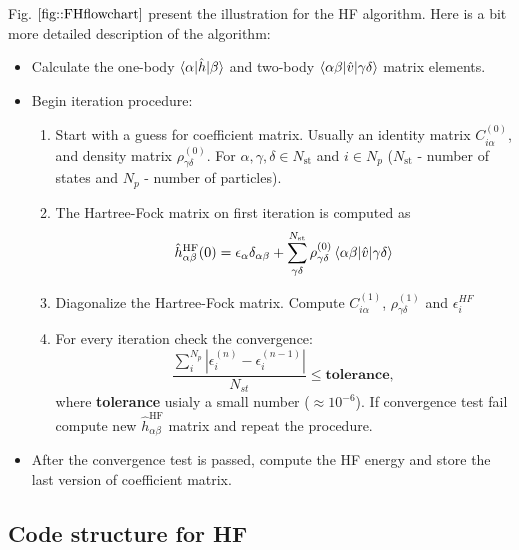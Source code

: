 \documentclass[twoside,english]{uiofysmaster}
\theoremstyle{definition}
\begin{document}
Fig. $\ref{fig::FHflowchart}$ present the illustration for the HF algorithm. Here is a bit more detailed description of the algorithm:
\begin{tcolorbox}
	\begin{itemize}
		\item Calculate the one-body $\braket{\alpha|\hat{h}|\beta}$ and two-body $\braket{\alpha\beta|\hat{v}|\gamma\delta}$ matrix elements.  \\
		\item Begin iteration procedure:
		\begin{enumerate}
			\item Start with a guess for coefficient matrix. Usually an identity matrix $C^{(0)}_{i\alpha}$,  and density matrix $\rho^{(0)}_{\gamma\delta}$. For $\alpha, \gamma, \delta \in N_{\text{st}}$ and $i \in N_{p}$ ($N_{\text{st}}$ - number of states and $N_{p}$ - number of particles). 
			\item The Hartree-Fock matrix on first iteration is computed as 
			 \[ \hat{h}^{\text{HF}}_{\alpha \beta}(0) = \epsilon_\alpha \delta_{\alpha\beta} + \sum_{\gamma\delta}^{N_{\text{st}}} \rho^{(0)}_{\gamma\delta} \braket{\alpha\beta|\hat{v}|\gamma\delta}  \] 
			 \item Diagonalize the Hartree-Fock matrix. Compute  $C^{(1)}_{i\alpha}$,   $\rho^{(1)}_{\gamma\delta}$ and $\epsilon_i^{HF}$
			 \item For every iteration check the convergence:
			 \[\frac{\sum_{i}^{N_p} |\epsilon_i^{(n)}- \epsilon_i^{(n-1)}|}{N_{st}} \leq \textbf{tolerance},\]
			 where \textbf{tolerance} usialy a small number ($\approx 10^{-6}$). If convergence test fail compute new $\hat{h}^{\text{HF}}_{\alpha \beta}$ matrix and repeat the procedure.			 	
		\end{enumerate} 
		\item After the convergence test is passed, compute the HF energy and store the last version of coefficient matrix. 
	\end{itemize}
\end{tcolorbox}

\subsection{Code structure for HF}
\end{document}

